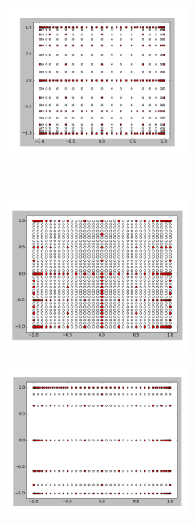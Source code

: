 \begin{center}
\begin{figure}[!h]
    \centering
    \begin{subfigure}[b]{0.45\textwidth}
				\includegraphics[width=\linewidth,height=5cm]{images/0.png}
    \end{subfigure}
		~
    \begin{subfigure}[b]{0.45\textwidth}
        \includegraphics[width=\linewidth,height=5cm]{images/2.png}
    \end{subfigure}

		\begin{subfigure}[b]{0.45\textwidth}
				\includegraphics[width=\linewidth,height=5cm]{images/mixed.png}
		\end{subfigure}
\end{figure}
\end{center}

